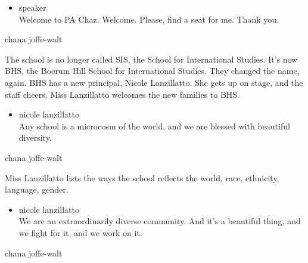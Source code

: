 \begin{itemize}
\tightlist
\item
  speaker\\
  Welcome to PA Chaz. Welcome. Please, find a seat for me. Thank you.
\end{itemize}

chana joffe-walt

The school is no longer called SIS, the School for International
Studies. It's now BHS, the Boerum Hill School for International Studies.
They changed the name, again. BHS has a new principal, Nicole
Lanzillatto. She gets up on stage, and the staff cheers. Miss
Lanzillatto welcomes the new families to BHS.

\begin{itemize}
\tightlist
\item
  nicole lanzillatto\\
  Any school is a microcosm of the world, and we are blessed with
  beautiful diversity.
\end{itemize}

chana joffe-walt

Miss Lanzillatto lists the ways the school reflects the world, race,
ethnicity, language, gender.

\begin{itemize}
\tightlist
\item
  nicole lanzillatto\\
  We are an extraordinarily diverse community. And it's a beautiful
  thing, and we fight for it, and we work on it.
\end{itemize}

chana joffe-walt


